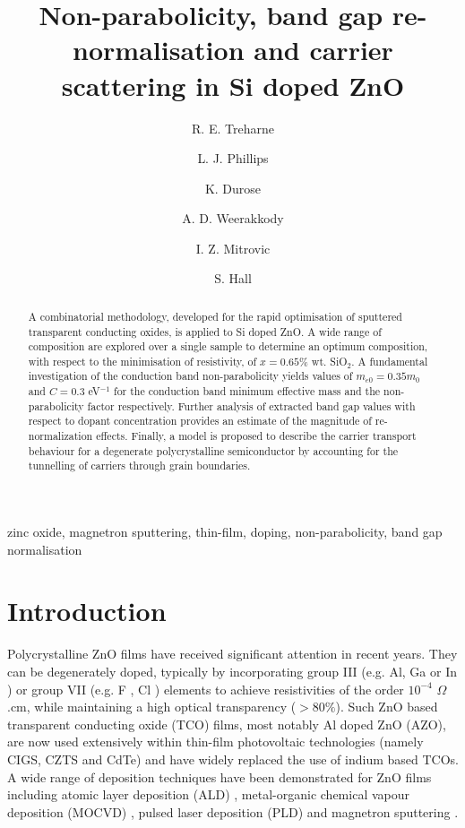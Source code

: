 \documentclass[final,5p,times]{elsarticle}
\begin{document}
\begin{frontmatter}


\title{Non-parabolicity, band gap re-normalisation and carrier scattering in Si doped ZnO}
\author[label1]{R. E. Treharne}
\author[label1]{L. J. Phillips}
\author[label1]{K. Durose}
\address[label1]{Stephenson Institute for Renewable Energy, University of Liverpool, UK}
\author[label2]{A. D. Weerakkody}
\author[label2]{I. Z. Mitrovic}
\author[label2]{S. Hall}
\address[label2]{Department of Electrical Eng. and Electronics, University of Liverpool, UK}

\begin{abstract}
A combinatorial methodology, developed for the rapid optimisation of sputtered transparent conducting oxides, is applied to Si doped ZnO. A wide range of composition are explored over a single sample to determine an optimum composition, with respect to the minimisation of resistivity, of $x=0.65\%$ wt. SiO$_2$. A fundamental investigation of the conduction band non-parabolicity yields values of $m_{e0}=0.35m_0$ and $C=0.3$ eV$^{-1}$ for the conduction band minimum effective mass and the non-parabolicity factor respectively. Further analysis of extracted band gap values with respect to dopant concentration provides an estimate of the magnitude of re-normalization effects. Finally, a model is proposed to describe the carrier transport behaviour for a degenerate polycrystalline semiconductor by accounting for the tunnelling of carriers through grain boundaries.
\end{abstract}


\begin{keyword}
zinc oxide, magnetron sputtering, thin-film, doping, non-parabolicity, band gap normalisation
\end{keyword}

\end{frontmatter}


\newpage
\section{Introduction}

Polycrystalline ZnO films have received significant attention in recent years. They can be degenerately doped, typically by incorporating group III (e.g. Al, Ga or In \cite{Minami2005}) or group VII (e.g. F \cite{Gordon1991, Treharne2010}, Cl \cite{Lincot2009}) elements to achieve resistivities of the order $10^{-4}$ $\Omega$.cm, while maintaining a high optical transparency ($>80\%$). Such ZnO based transparent conducting oxide (TCO) films, most notably Al doped ZnO (AZO), are now used extensively within thin-film photovoltaic technologies (namely CIGS, CZTS and CdTe) and have widely replaced the use of indium based TCOs. A wide range of deposition techniques have been demonstrated for ZnO films including atomic layer deposition (ALD) \cite{Chalker2013}, metal-organic chemical vapour deposition (MOCVD) \cite{Myong1997}, pulsed laser deposition (PLD) \cite{Shin2006} and magnetron sputtering \cite{Minami2005, Minami2006, Ellmer2001}. 
\end{document}
